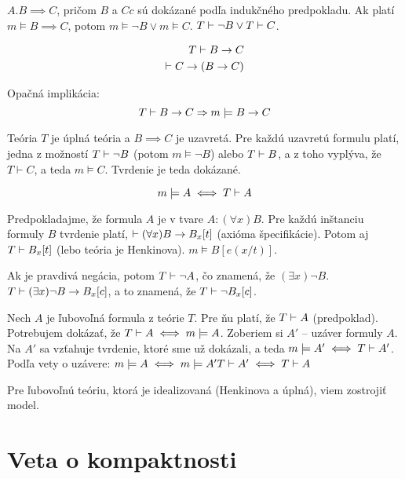 \par $A. B \implies C$, pričom $B$ a $Cc$ sú dokázané podľa indukčného
predpokladu. Ak platí $m \models B \implies C$, potom $m \models \neg B \lor m
\models C$. $T \vdash \neg B \lor T \vdash C$.

\begin{eqnarray*}
    T \vdash B \rightarrow C \\
    \vdash C \rightarrow (B \rightarrow C)
\end{eqnarray*}

Opačná implikácia:
\begin{equation*}
    T\vdash B\rightarrow C\Rightarrow m \models B \rightarrow C
\end{equation*}

Teória $T$ je úplná teória a $B \implies C$ je uzavretá. Pre každú uzavretú
formulu platí, jedna z možností $T \vdash \neg B$ (potom $m \models \neg B$)
alebo $T \vdash B$, a z toho vyplýva, že $T \vdash C$, a teda $m \models C$.
Tvrdenie je teda dokázané.

\begin{equation}
    m \models A \iff T \vdash A
\end{equation}

\par Predpokladajme, že formula $A$ je v tvare $A: (\forall x) B$. Pre každú
inštanciu formuly $B$ tvrdenie platí, $\vdash (\forall x) B \rightarrow B_x[t]$
(axióma špecifikácie). Potom aj $T \vdash B_x[t]$ (lebo teória je Henkinova). $m \models B[e(x/t)]$.

\par Ak je pravdivá negácia, potom $T \vdash \neg A$, čo znamená, že $(\exists
x) \neg B$. $T \vdash (\exists x) \neg B \rightarrow B_x[c]$, a to znamená, že $T
\vdash \neg B_x[c]$.

\par Nech $A$ je ľubovoľná formula z teórie $T$. Pre ňu platí, že $T \vdash A$
(predpoklad). Potrebujem dokázať, že $T \vdash A \iff m \models A$. Zoberiem si
$A'$ -- uzáver formuly $A$. Na $A'$ sa vzťahuje tvrdenie, ktoré sme už dokázali,
a teda $m \models A' \iff T \vdash A'$. Podľa vety o uzávere:
$m \models A \iff  m\models A' T \vdash A' \iff T \vdash A$

\par Pre ľubovoľnú teóriu, ktorá je idealizovaná (Henkinova a úplná), viem
zostrojiť model.

\section{Veta o kompaktnosti}

